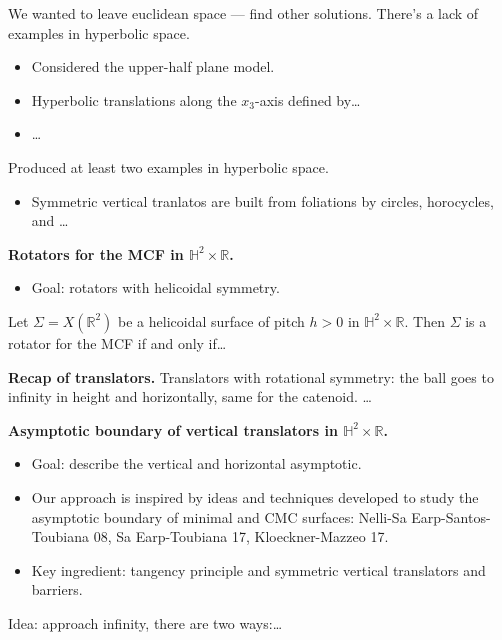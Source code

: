 \noindent
We wanted to leave euclidean space --- find
other solutions. There's a lack of examples
in hyperbolic space.

\begin{itemize}
\item Considered the upper-half plane model.
\item Hyperbolic translations along the
$x_3$-axis defined by…
\item …
\end{itemize}

\noindent
Produced at least two examples in hyperbolic
space.

\begin{itemize}
\item Symmetric vertical tranlatos are built
from foliations by circles, horocycles, and
…
\end{itemize}

\medskip\noindent
{\bf Rotators for the MCF in $\mathbb{H}^2
\times \mathbb{R}$.}

\begin{itemize}
\item Goal: rotators with helicoidal
symmetry.
\end{itemize}

\begin{theorem}
\label{theorem-dlrds25}
Let $\Sigma=X(\mathbb{R}^2)$ be a helicoidal
surface of pitch $h>0$ in $\mathbb{H}^2
\times \mathbb{R}$. Then $\Sigma$ is a
rotator for the MCF if and only if…
\end{theorem}

\medskip\noindent
{\bf Recap of translators.}
Translators with rotational symmetry: the
ball goes to infinity in height and
horizontally, same for the catenoid. …

\medskip\noindent
{\bf Asymptotic boundary of vertical
translators in $\mathbb{H}^2 \times
\mathbb{R}$.}
\begin{itemize}
\item Goal: describe the vertical and
horizontal asymptotic.
\item Our approach is inspired by ideas and
techniques developed to study the asymptotic
boundary of minimal and CMC surfaces:
Nelli-Sa Earp-Santos-Toubiana 08, Sa
Earp-Toubiana 17, Kloeckner-Mazzeo 17.
\item Key ingredient: tangency principle and
symmetric vertical translators and barriers.
\end{itemize}

\noindent
Idea: approach infinity, there are two
ways:…


